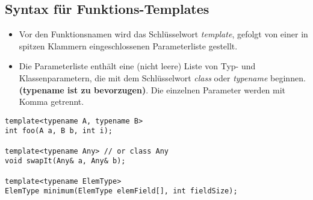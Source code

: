\begin{multicols}{2}
\subsection{Syntax für Funktions-Templates}
\begin{itemize}
	\item Vor den Funktionsnamen wird das Schlüsselwort \emph{template}, gefolgt von einer in spitzen Klammern eingeschlossenen Parameterliste gestellt.
	\item Die Parameterliste enthält eine (nicht leere) Liste von Typ- und Klassenparametern, die mit dem Schlüsselwort \emph{class} oder \emph{typename} beginnen. \textbf{(typename ist zu bevorzugen)}. Die einzelnen Parameter werden mit Komma getrennt.
\end{itemize}
\vfill\null
\columnbreak
\begin{minipage}{\linewidth}
\vspace{-\baselineskip}
\begin{lstlisting}
template<typename A, typename B>
int foo(A a, B b, int i);

template<typename Any> // or class Any
void swapIt(Any& a, Any& b);

template<typename ElemType>
ElemType minimum(ElemType elemField[], int fieldSize);
\end{lstlisting}
\end{minipage}
\end{multicols}
\vfill
\pagebreak\newpage

